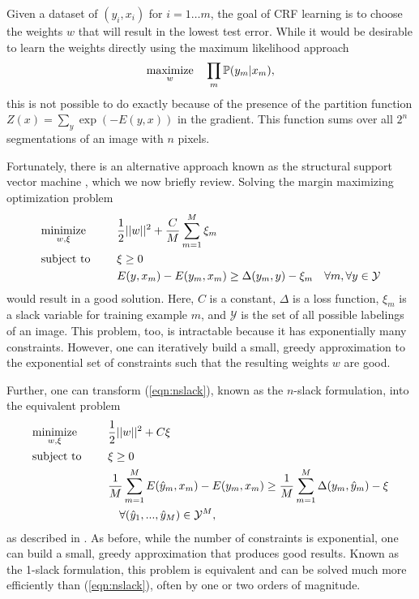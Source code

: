 \documentclass[graybox]{svmult}
\begin{document}
Given a dataset of $(y_i, x_i)$ for $i=1 \dots m$, the goal of CRF learning is to choose the weights $w$ that will result in the lowest test error. While it would be desirable to learn the weights directly using the maximum likelihood approach
\begin{align}
  \underset{w}{\mbox{maximize}}\quad \prod_m \mathbb{P}(y_m | x_m),
\end{align}
this is not possible to do exactly because of the presence of the partition function $Z(x) = \sum_{y} \exp(-E(y, x))$ in the gradient.  This function sums over all $2^n$ segmentations of an image with $n$ pixels.
  
Fortunately, there is an alternative approach known as the structural support vector machine \cite{taskar2005a, tsochantaridis2005a, szummer2008a}, which we now briefly review.  Solving the margin maximizing optimization problem
\begin{equation}
  \begin{aligned}
    & \minimize{w, \xi} & & \frac{1}{2} ||w||^2 + \frac{C}{M} \sum_{m=1}^M \xi_m \label{eqn:nslack} \\
    & \st & & \xi \geq 0 \\
& & & E ( y, x_m ) - E ( y_m, x_m ) \geq \Delta (y_m, y) - \xi_m \quad \forall m, \forall y \in \mathcal{Y}
  \end{aligned}
\end{equation}
would result in a good solution. Here, $C$ is a constant, $\Delta$ is a loss function, $\xi_m$ is a slack variable for training example $m$, and $\mathcal{Y}$ is the set of all possible labelings of an image. This problem, too, is intractable because it has exponentially many constraints.  However, one can iteratively build a small, greedy approximation to the exponential set of constraints such that the resulting weights $w$ are good.

Further, one can transform (\ref{eqn:nslack}), known as the $n$-slack formulation, into the equivalent problem
\begin{equation}
  \begin{aligned}
    & \underset{w, \xi}{\mbox{minimize}}\quad & & \frac{1}{2} ||w||^2 + C\xi \\
    & \mbox{subject to }\quad & & \xi \geq 0 \\
    & & & \frac{1}{M} \sum_{m=1}^M E ( \hat{y}_m, x_m )
    - E ( y_m, x_m ) \geq \frac{1}{M} \sum_{m=1}^M \Delta(y_m, \hat{y}_m) - \xi \\
    & & & \quad \forall (\hat{y}_1, ..., \hat{y}_M) \in \mathcal{Y}^M,
  \end{aligned}
\end{equation}
as described in \cite{joachims2009a}.  As before, while the number of constraints is exponential, one can build a small, greedy approximation that produces good results.  Known as the 1-slack formulation, this problem is equivalent and can be solved much more efficiently than (\ref{eqn:nslack}), often by one or two orders of magnitude.
\end{document}
